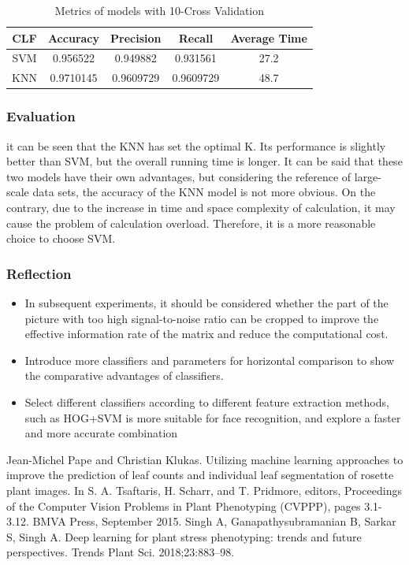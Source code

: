 \documentclass[conference]{IEEEtran}
\begin{document}
\begin{table}[htbp]
\caption{Metrics of models with 10-Cross Validation}
\begin{center}
\begin{tabular}{|c|c|c|c|c|}



\hline
CLF &Accuracy&Precision &Recall&Average Time\\
\hline
SVM&0.956522 &0.949882   &0.931561 & 27.2\\
\hline
KNN&0.9710145 &0.9609729   &0.9609729& 48.7 \\
\hline


\end{tabular}
\label{tab3}
\end{center}
\end{table}

\subsubsection{Evaluation}
it can be seen that the KNN has set the optimal K. Its performance is slightly better than SVM, but the overall running time is longer. It can be said that these two models have their own advantages, but considering the reference of large-scale data sets, the accuracy of the KNN model is not more obvious. On the contrary, due to the increase in time and space complexity of calculation, it may cause the problem of calculation overload. Therefore, it is a more reasonable choice to choose SVM.\
\subsubsection{Reflection}
\begin{itemize}
\item In subsequent experiments, it should be considered whether the part of the picture with too high signal-to-noise ratio can be cropped to improve the effective information rate of the matrix and reduce the computational cost.
\item Introduce more classifiers and parameters for horizontal comparison to show the comparative advantages of classifiers.
\item Select different classifiers according to different feature extraction methods, such as HOG+SVM is more suitable for face recognition, and explore a faster and more accurate combination
\end{itemize}



\begin{thebibliography}{00}
 Jean-Michel Pape and Christian Klukas. Utilizing machine learning approaches to improve the prediction of leaf counts and individual leaf segmentation of rosette plant images. In S. A. Tsaftaris, H. Scharr, and T. Pridmore, editors, Proceedings of the Computer Vision Problems in Plant Phenotyping (CVPPP), pages 3.1-3.12. BMVA Press, September 2015.
\bibitem{b2} Singh A, Ganapathysubramanian B, Sarkar S, Singh A. Deep learning for
plant stress phenotyping: trends and future perspectives. Trends Plant
Sci. 2018;23:883–98.


\end{thebibliography}
\end{document}
